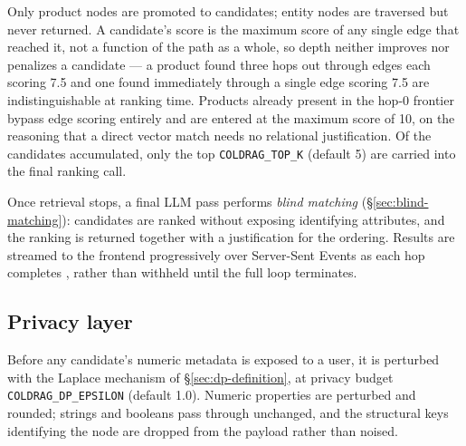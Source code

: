 Only product nodes are promoted to candidates; entity nodes are traversed but never returned. A candidate's score is the maximum score of any single edge that reached it, not a function of the path as a whole, so depth neither improves nor penalizes a candidate — a product found three hops out through edges each scoring 7.5 and one found immediately through a single edge scoring 7.5 are indistinguishable at ranking time. Products already present in the hop-0 frontier bypass edge scoring entirely and are entered at the maximum score of 10, on the reasoning that a direct vector match needs no relational justification. Of the candidates accumulated, only the top \texttt{COLDRAG\_TOP\_K} (default 5) are carried into the final ranking call. 

Once retrieval stops, a final LLM pass performs \emph{blind matching} (\S\ref{sec:blind-matching}): candidates are ranked without exposing identifying attributes, and the ranking is returned together with a justification for the ordering. Results are streamed to the frontend progressively over Server-Sent Events as each hop completes \citep{whatwg2026server}, rather than withheld until the full loop terminates.

\subsection{Privacy layer}
\label{sec:coldrag-privacy}

Before any candidate's numeric metadata is exposed to a user, it is perturbed with the Laplace mechanism of \S\ref{sec:dp-definition}, at privacy budget \texttt{COLDRAG\_DP\_EPSILON} (default 1.0). Numeric properties are perturbed and rounded; strings and booleans pass through unchanged, and the structural keys identifying the node are dropped from the payload rather than noised.

